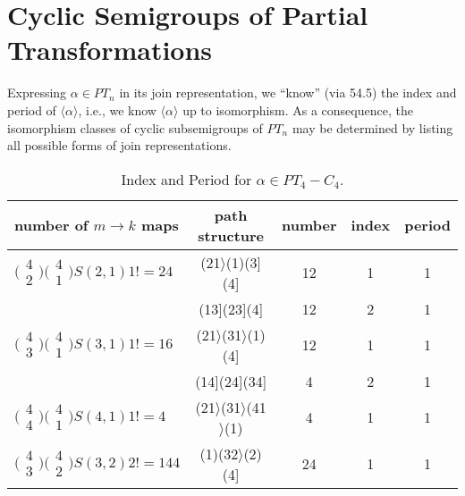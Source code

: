 \documentclass{surv-l}
\numberwithin{equation}{section}
\numberwithin{table}{section}
\numberwithin{figure}{section}
\theoremstyle{definition}
\begin{document}
\section{Cyclic Semigroups of Partial Transformations}\label{sec11.55}

Expressing $\alpha\in PT_{n}$ in its join representation, we
``know'' (via 54.5) the index and period of
$\langle\alpha\rangle$, i.e., we know $\langle\alpha\rangle$ up to
isomorphism. As a consequence, the isomorphism classes of cyclic
subsemigroups of $PT_{n}$ may be determined by listing all
possible forms of join representations.

\begin{table}[!h]
\caption{Index and Period for $\alpha\in
PT_{4}-C_{4}$.\label{tab11.55.1}}
{\begin{tabular}{|l|c|c|c|c|}
\hline
\textbf{number of} $m\rightarrow k$ \textbf{maps} &\textbf{path structure} &\textbf{number} &\textbf{index} &\textbf{period} \\
\hline
$\big(\!\begin{smallmatrix}4 \\ 2\end{smallmatrix}\!\big)\big(\!\begin{smallmatrix}4\\ 1\end{smallmatrix}\!\big)S(2,1)1!=24$ & (21$\rangle$(1)(3](4] &12 &1 &1 \\
&(13](23](4] &12 &2 &1 \\
\hline
$\big(\!\begin{smallmatrix}4\\ 3\end{smallmatrix}\!\big)\big(\!\begin{smallmatrix}4\\ 1\end{smallmatrix}\!\big)S(3,1)1!=16$ &(21$\rangle$(31$\rangle$(1)(4] &12 &1 &1 \\
&(14](24](34] &4 &2 &1 \\
\hline
$\big(\!\begin{smallmatrix}4\\ 4\end{smallmatrix}\!\big)\big(\!\begin{smallmatrix}4\\ 1\end{smallmatrix}\!\big)S(4,1)1!=4$ &(21$\rangle$(31$\rangle$(41$\rangle$(1) &4 &1 &1 \\
\hline
$\big(\!\begin{smallmatrix}4\\ 3 \end{smallmatrix}\!\big)\big(\!\begin{smallmatrix}4\\ 2\end{smallmatrix}\!\big)S(3,2)2!=144$ &(1)(32$\rangle$(2)(4] &24 &1 &1 \\

\end{tabular}}
\end{table}
\end{document}

